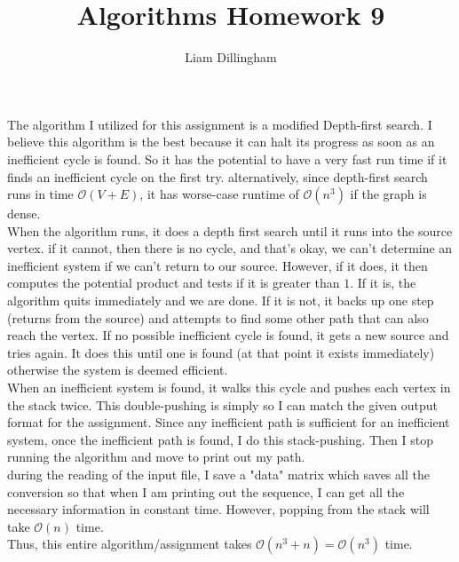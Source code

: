 \documentclass[20pt]{article} %
\title{Algorithms Homework 9}
\author{Liam Dillingham}
\begin{document}
\maketitle

The algorithm I utilized for this assignment is a modified Depth-first search.  I believe this algorithm is the best because it can halt its progress as soon as an inefficient cycle is found.  So it has the potential to have a very fast run time if it finds an inefficient cycle on the first try. alternatively, since depth-first search runs in time $\mathcal{O}(V + E)$, it has worse-case runtime of $\mathcal{O}(n^{3})$ if the graph is dense. \\

When the algorithm runs, it does a depth first search until it runs into the source vertex.  if it cannot, then there is no cycle, and that's okay, we can't determine an inefficient system if we can't return to our source.  However, if it does, it then computes the potential product and tests if it is greater than $1$.  If it is, the algorithm quits immediately and we are done.  If it is not, it backs up one step (returns from the source) and attempts to find some other path that can also reach the vertex.  If no possible inefficient cycle is found, it gets a new source and tries again.  It does this until one is found (at that point it exists immediately) otherwise the system is deemed efficient. \\

When an inefficient system is found, it walks this cycle and pushes each vertex in the stack twice.  This double-pushing is simply so I can match the given output format for the assignment.  Since any inefficient path is sufficient for an inefficient system, once the inefficient path is found, I do this stack-pushing.  Then I stop running the algorithm and move to print out my path. \\ during the reading of the input file, I save a "data" matrix which saves all the conversion so that when I am printing out the sequence, I can get all the necessary information in constant time. However, popping from the stack will take $\mathcal{O}(n)$ time. \\

Thus, this entire algorithm/assignment takes $\mathcal{O}(n^{3} + n) = \mathcal{O}(n^{3})$ time. 
\end{document}
